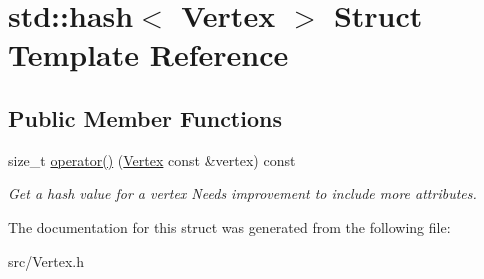 \hypertarget{structstd_1_1hash_3_01_vertex_01_4}{}\section{std\+::hash$<$ Vertex $>$ Struct Template Reference}
\label{structstd_1_1hash_3_01_vertex_01_4}
\subsection*{Public Member Functions}
\begin{DoxyCompactItemize}
\item 
\mbox{\label{structstd_1_1hash_3_01_vertex_01_4_a6ca0b0b4c01c345481ca4ae6a3b791e1}} 
size\+\_\+t \mbox{\hyperlink{structstd_1_1hash_3_01_vertex_01_4_a6ca0b0b4c01c345481ca4ae6a3b791e1}{operator()}} (\mbox{\hyperlink{struct_vertex}{Vertex}} const \&vertex) const
\begin{DoxyCompactList}\small\item\em Get a hash value for a vertex Needs improvement to include more attributes. \end{DoxyCompactList}\end{DoxyCompactItemize}


The documentation for this struct was generated from the following file\+:\begin{DoxyCompactItemize}
\item 
src/Vertex.\+h\end{DoxyCompactItemize}
